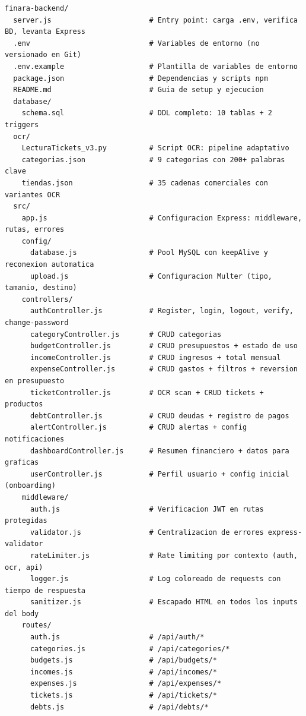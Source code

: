 \begin{lstlisting}[style=bash, caption={Árbol de directorios del backend FINARA}, label={lst:tree}]
finara-backend/
  server.js                       # Entry point: carga .env, verifica BD, levanta Express
  .env                            # Variables de entorno (no versionado en Git)
  .env.example                    # Plantilla de variables de entorno
  package.json                    # Dependencias y scripts npm
  README.md                       # Guia de setup y ejecucion
  database/
    schema.sql                    # DDL completo: 10 tablas + 2 triggers
  ocr/
    LecturaTickets_v3.py          # Script OCR: pipeline adaptativo
    categorias.json               # 9 categorias con 200+ palabras clave
    tiendas.json                  # 35 cadenas comerciales con variantes OCR
  src/
    app.js                        # Configuracion Express: middleware, rutas, errores
    config/
      database.js                 # Pool MySQL con keepAlive y reconexion automatica
      upload.js                   # Configuracion Multer (tipo, tamanio, destino)
    controllers/
      authController.js           # Register, login, logout, verify, change-password
      categoryController.js       # CRUD categorias
      budgetController.js         # CRUD presupuestos + estado de uso
      incomeController.js         # CRUD ingresos + total mensual
      expenseController.js        # CRUD gastos + filtros + reversion en presupuesto
      ticketController.js         # OCR scan + CRUD tickets + productos
      debtController.js           # CRUD deudas + registro de pagos
      alertController.js          # CRUD alertas + config notificaciones
      dashboardController.js      # Resumen financiero + datos para graficas
      userController.js           # Perfil usuario + config inicial (onboarding)
    middleware/
      auth.js                     # Verificacion JWT en rutas protegidas
      validator.js                # Centralizacion de errores express-validator
      rateLimiter.js              # Rate limiting por contexto (auth, ocr, api)
      logger.js                   # Log coloreado de requests con tiempo de respuesta
      sanitizer.js                # Escapado HTML en todos los inputs del body
    routes/
      auth.js                     # /api/auth/*
      categories.js               # /api/categories/*
      budgets.js                  # /api/budgets/*
      incomes.js                  # /api/incomes/*
      expenses.js                 # /api/expenses/*
      tickets.js                  # /api/tickets/*
      debts.js                    # /api/debts/*

\end{lstlisting}
